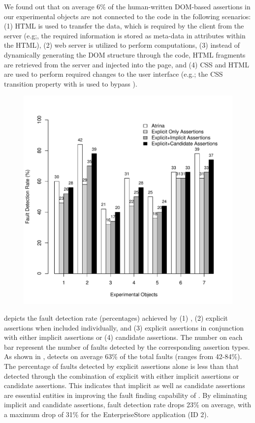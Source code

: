 We found out that on average 6\% of the human-written DOM-based assertions in our experimental objects are not connected to the \javascript code in the following scenarios: (1) HTML is used to transfer the data, which is required by the client from the server (e.g;, the required information is stored as meta-data in attributes within the HTML), (2) web server is utilized to perform computations, (3) instead of dynamically generating the DOM structure through the \javascript code, HTML fragments are retrieved from the server and injected into the page, and (4) CSS and HTML are used to perform required changes to the user interface (e.g.; the CSS transition property with  is used to bypass \javascript).

\begin{figure}[!t]
  \centering
  \includegraphics[width=0.7\hsize]{r-scripts/assertionTypeFaultDetec}
  \vspace{0.2in} 
  \label{Fig:assertionTypeFaultDetec} 
\end{figure}

  depicts the fault detection rate (percentages) achieved by (1) \atrina, (2) explicit assertions when included individually, and (3) explicit assertions in conjunction with either implicit assertions or (4) candidate assertions. The number on each bar represent the number of faults detected by the corresponding assertion types. As shown in , \atrina detects on average 63\% of the total faults (ranges from 42-84\%).
The percentage of faults detected by explicit assertions alone is less than that detected through the combination of explicit with either implicit assertions or candidate assertions. This indicates that implicit as well as candidate assertions are essential entities in improving the fault finding capability of \atrina. By eliminating implicit and candidate assertions, fault detection rate drops 23\% on average, with a maximum drop of 31\% for the EnterpriseStore application (ID 2).

